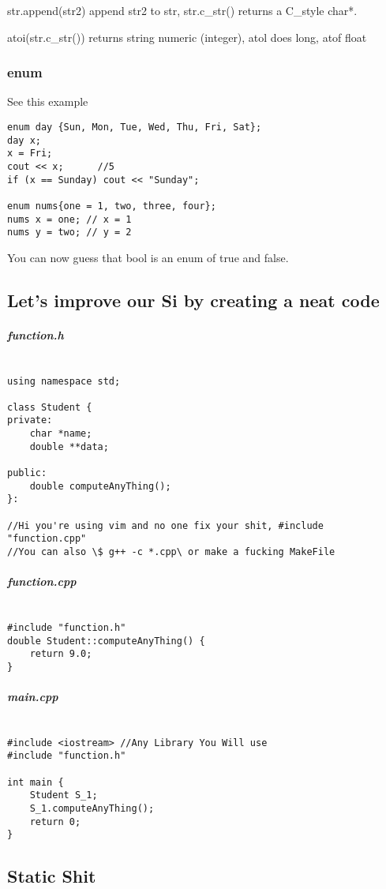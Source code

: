 \documentclass{article}
\begin{document}
str.append(str2) append str2 to str, str.c\_str() returns a C\_style char*. 

atoi(str.c\_str()) returns string numeric (integer), atol does long, atof float

\subsubsection{enum}
See this example
\begin{lstlisting}
enum day {Sun, Mon, Tue, Wed, Thu, Fri, Sat};
day x;
x = Fri;
cout << x;		//5
if (x == Sunday) cout << "Sunday";

enum nums{one = 1, two, three, four};
nums x = one; // x = 1
nums y = two; // y = 2
\end{lstlisting}

You can now guess that bool is an enum of true and false.

\subsection{Let's improve our Si by creating a neat code}

\subparagraph{function.h}
\begin{lstlisting}

using namespace std;

class Student {
private:
	char *name;
	double **data;

public:
	double computeAnyThing();
}:

//Hi you're using vim and no one fix your shit, #include "function.cpp"
//You can also \$ g++ -c *.cpp\ or make a fucking MakeFile
\end{lstlisting}

\subparagraph{function.cpp}
\begin{lstlisting}

#include "function.h"
double Student::computeAnyThing() {
	return 9.0;
}

\end{lstlisting}

\subparagraph{main.cpp}
\begin{lstlisting}
	
#include <iostream> //Any Library You Will use
#include "function.h"

int main {
	Student S_1;
	S_1.computeAnyThing();
	return 0;
}
\end{lstlisting}

\newpage
\subsection{Static Shit}
\end{document}
